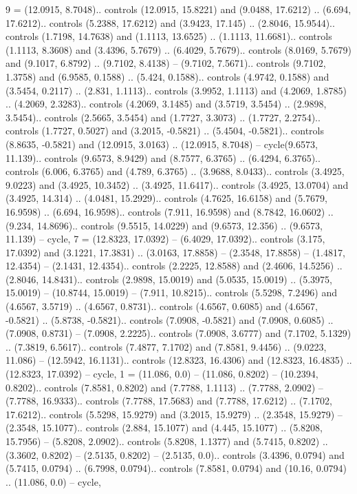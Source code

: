 {9} = {(12.0915, 8.7048).. controls (12.0915, 15.8221) and (9.0488, 17.6212) .. (6.694, 17.6212).. controls (5.2388, 17.6212) and (3.9423, 17.145) .. (2.8046, 15.9544).. controls (1.7198, 14.7638) and (1.1113, 13.6525) .. (1.1113, 11.6681).. controls (1.1113, 8.3608) and (3.4396, 5.7679) .. (6.4029, 5.7679).. controls (8.0169, 5.7679) and (9.1017, 6.8792) .. (9.7102, 8.4138) -- (9.7102, 7.5671).. controls (9.7102, 1.3758) and (6.9585, 0.1588) .. (5.424, 0.1588).. controls (4.9742, 0.1588) and (3.5454, 0.2117) .. (2.831, 1.1113).. controls (3.9952, 1.1113) and (4.2069, 1.8785) .. (4.2069, 2.3283).. controls (4.2069, 3.1485) and (3.5719, 3.5454) .. (2.9898, 3.5454).. controls (2.5665, 3.5454) and (1.7727, 3.3073) .. (1.7727, 2.2754).. controls (1.7727, 0.5027) and (3.2015, -0.5821) .. (5.4504, -0.5821).. controls (8.8635, -0.5821) and (12.0915, 3.0163) .. (12.0915, 8.7048) -- cycle(9.6573, 11.139).. controls (9.6573, 8.9429) and (8.7577, 6.3765) .. (6.4294, 6.3765).. controls (6.006, 6.3765) and (4.789, 6.3765) .. (3.9688, 8.0433).. controls (3.4925, 9.0223) and (3.4925, 10.3452) .. (3.4925, 11.6417).. controls (3.4925, 13.0704) and (3.4925, 14.314) .. (4.0481, 15.2929).. controls (4.7625, 16.6158) and (5.7679, 16.9598) .. (6.694, 16.9598).. controls (7.911, 16.9598) and (8.7842, 16.0602) .. (9.234, 14.8696).. controls (9.5515, 14.0229) and (9.6573, 12.356) .. (9.6573, 11.139) -- cycle},
{7} = {(12.8323, 17.0392) -- (6.4029, 17.0392).. controls (3.175, 17.0392) and (3.1221, 17.3831) .. (3.0163, 17.8858) -- (2.3548, 17.8858) -- (1.4817, 12.4354) -- (2.1431, 12.4354).. controls (2.2225, 12.8588) and (2.4606, 14.5256) .. (2.8046, 14.8431).. controls (2.9898, 15.0019) and (5.0535, 15.0019) .. (5.3975, 15.0019) -- (10.8744, 15.0019) -- (7.911, 10.8215).. controls (5.5298, 7.2496) and (4.6567, 3.5719) .. (4.6567, 0.8731).. controls (4.6567, 0.6085) and (4.6567, -0.5821) .. (5.8738, -0.5821).. controls (7.0908, -0.5821) and (7.0908, 0.6085) .. (7.0908, 0.8731) -- (7.0908, 2.2225).. controls (7.0908, 3.6777) and (7.1702, 5.1329) .. (7.3819, 6.5617).. controls (7.4877, 7.1702) and (7.8581, 9.4456) .. (9.0223, 11.086) -- (12.5942, 16.1131).. controls (12.8323, 16.4306) and (12.8323, 16.4835) .. (12.8323, 17.0392) -- cycle},
{1} = {(11.086, 0.0) -- (11.086, 0.8202) -- (10.2394, 0.8202).. controls (7.8581, 0.8202) and (7.7788, 1.1113) .. (7.7788, 2.0902) -- (7.7788, 16.9333).. controls (7.7788, 17.5683) and (7.7788, 17.6212) .. (7.1702, 17.6212).. controls (5.5298, 15.9279) and (3.2015, 15.9279) .. (2.3548, 15.9279) -- (2.3548, 15.1077).. controls (2.884, 15.1077) and (4.445, 15.1077) .. (5.8208, 15.7956) -- (5.8208, 2.0902).. controls (5.8208, 1.1377) and (5.7415, 0.8202) .. (3.3602, 0.8202) -- (2.5135, 0.8202) -- (2.5135, 0.0).. controls (3.4396, 0.0794) and (5.7415, 0.0794) .. (6.7998, 0.0794).. controls (7.8581, 0.0794) and (10.16, 0.0794) .. (11.086, 0.0) -- cycle},
